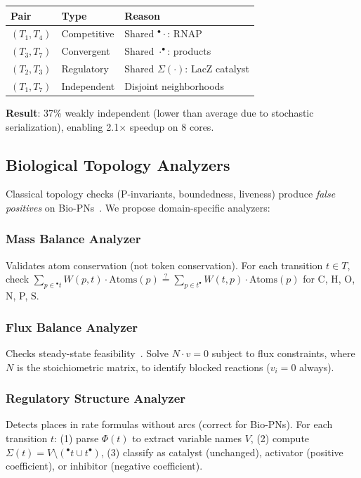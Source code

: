 \documentclass[twocolumn,11pt]{article}
\newcommand{\preset}[1]{\ensuremath{{}^{\bullet}#1}}
\newcommand{\postset}[1]{\ensuremath{#1^{\bullet}}}
\newcommand{\RegSet}[1]{\ensuremath{\Sigma(#1)}}
\begin{document}
\begin{small}
\begin{tabular}{lll}
\textbf{Pair} & \textbf{Type} & \textbf{Reason} \\ \hline
$(T_1, T_4)$ & Competitive & Shared $\preset{\cdot}$: RNAP \\
$(T_3, T_7)$ & Convergent & Shared $\postset{\cdot}$: products \\
$(T_2, T_3)$ & Regulatory & Shared $\RegSet{\cdot}$: LacZ catalyst \\
$(T_1, T_7)$ & Independent & Disjoint neighborhoods \\
\end{tabular}
\end{small}

\textbf{Result}: 37\% weakly independent (lower than average due to stochastic serialization), enabling 2.1$\times$ speedup on 8 cores.

\subsection{Biological Topology Analyzers}

Classical topology checks (P-invariants, boundedness, liveness) produce \emph{false positives} on Bio-PNs~\cite{Chaouiya2007}. We propose domain-specific analyzers:

\subsubsection{Mass Balance Analyzer}
Validates atom conservation (not token conservation). For each transition $t \in T$, check $\sum_{p \in \preset{t}} W(p,t) \cdot \text{Atoms}(p) \stackrel{?}{=} \sum_{p \in \postset{t}} W(t,p) \cdot \text{Atoms}(p)$ for C, H, O, N, P, S.
\subsubsection{Flux Balance Analyzer}
Checks steady-state feasibility~\cite{Orth2010}. Solve $N \cdot v = 0$ subject to flux constraints, where $N$ is the stoichiometric matrix, to identify blocked reactions ($v_i = 0$ always).
\subsubsection{Regulatory Structure Analyzer}
Detects places in rate formulas without arcs (correct for Bio-PNs). For each transition $t$: (1) parse $\Phi(t)$ to extract variable names $V$, (2) compute $\RegSet{t} = V \setminus (\preset{t} \cup \postset{t})$, (3) classify as catalyst (unchanged), activator (positive coefficient), or inhibitor (negative coefficient).
\end{document}
